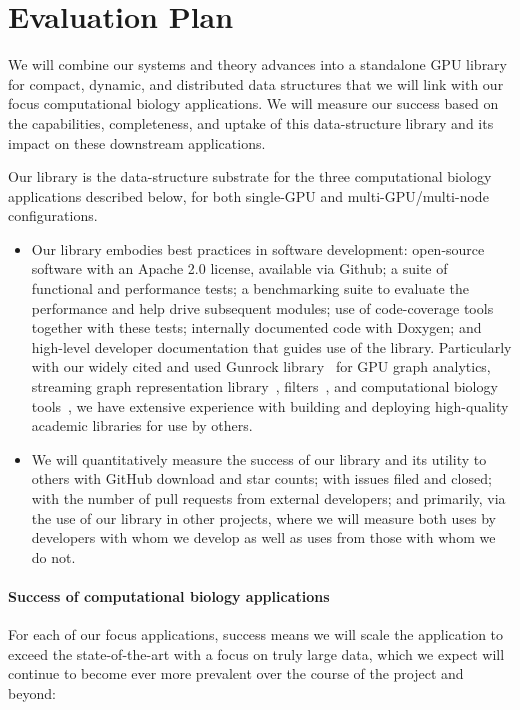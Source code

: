 
\section{Evaluation Plan}

 We will combine our systems and theory advances into a standalone GPU library for compact, dynamic, and distributed data structures that we will link with our focus computational biology applications. We will measure our success based on the capabilities, completeness, and uptake of this data-structure library and its impact on these downstream applications.

Our library is the data-structure substrate for the three computational biology applications described below, for both single-GPU and multi-GPU/multi-node configurations.

\begin{itemize}%
  \item Our library embodies best practices in software development: open-source software with an Apache 2.0 license, available via Github; a suite of functional and performance tests; a benchmarking suite to evaluate the performance and help drive subsequent modules; use of code-coverage tools together with these tests; internally documented code with Doxygen; and high-level developer documentation that guides use of the library. Particularly with our widely cited and used Gunrock library~\cite{Wang:2017:GGG} for GPU graph analytics, streaming graph representation library~\cite{pandey2021terrace}, filters~\cite{PandeyBJP17,PandeyCDBFJ21}, and computational biology tools~\cite{PandeyBeJo18,PandeyBeJo17b,PandeyAlBe18,pandey2021variantstore}, we have extensive experience with building and deploying high-quality academic libraries for use by others.
  \item We will quantitatively measure the success of our library and its utility to others with GitHub download and star counts; with issues filed and closed; with the number of pull requests from external developers; and primarily, via the use of our library in other projects, where we will measure both uses by developers with whom we develop as well as uses from those with whom we do not.
\end{itemize}

\paragraph{Success of computational biology applications}
For each of our focus applications, success means we will scale the application to exceed the state-of-the-art with a focus on truly large data, which we expect will continue to become ever more prevalent over the course of the project and beyond:

